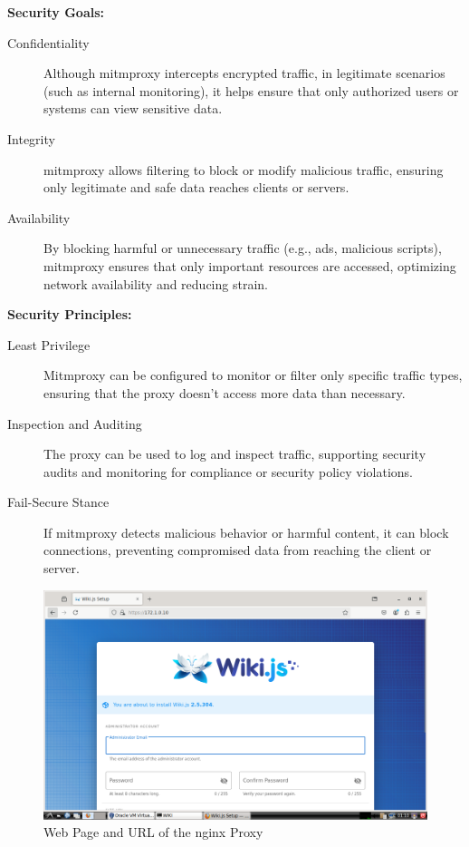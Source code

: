 \documentclass[12pt,a4paper]{report}
\begin{document}
\begin{description}
	\textbf{Security Goals:}
\begin{description}
	\item[Confidentiality] Although mitmproxy intercepts encrypted traffic, in legitimate scenarios (such as internal monitoring), it helps ensure that only authorized users or systems can view sensitive data.
	\item[Integrity] mitmproxy allows filtering to block or modify malicious traffic, ensuring only legitimate and safe data reaches clients or servers.
	\item [Availability] By blocking harmful or unnecessary traffic (e.g., ads, malicious scripts), mitmproxy ensures that only important resources are accessed, optimizing network availability and reducing strain.
\end{description}


\textbf{Security Principles:}
\begin{description}
	\item[Least Privilege] Mitmproxy can be configured to monitor or filter only specific traffic types, ensuring that the proxy doesn’t access more data than necessary.
	\item[Inspection and Auditing] The proxy can be used to log and inspect traffic, supporting security audits and monitoring for compliance or security policy violations.
	\item[Fail-Secure Stance] If mitmproxy detects malicious behavior or harmful content, it can block connections, preventing compromised data from reaching the client or server.
\end{description}
\end{description}

\begin{figure}[H]
    \centering
    \includegraphics[width=\textwidth]{nginx proxy url and web page.png} 
    \caption{Web Page and URL of the nginx Proxy}
    \label{fig:mesh1}
\end{figure}
\end{document}
